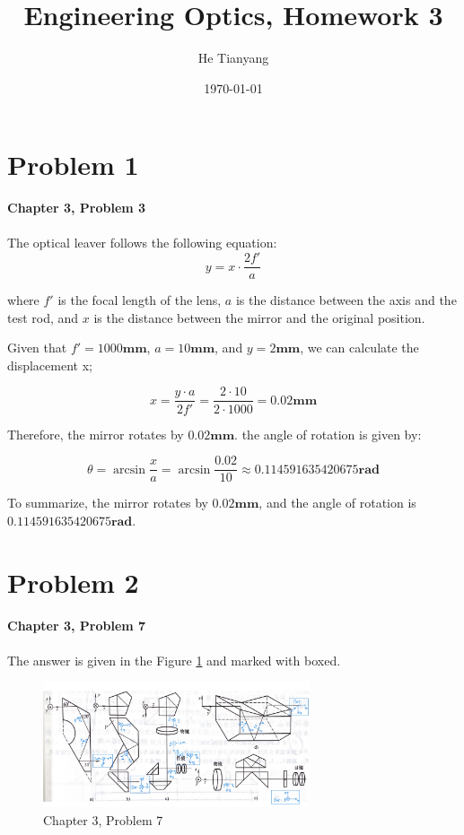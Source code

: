 \documentclass{article}
\title{Engineering Optics, Homework 3}
\author{He Tianyang}
\date{\today}
\begin{document}
\maketitle

\section{Problem 1}
\textbf{Chapter 3, Problem 3}\\\\

The optical leaver follows the following equation:
\begin{equation}
    y = x\cdot\frac{2f'}{a}
\end{equation}

where $f'$ is the focal length of the lens, $a$ is the distance between the axis and the test rod, and $x$ is the distance between the mirror and the original position.

Given that $f' = 1000\textbf{mm}$, $a = 10\textbf{mm}$, and $y = 2\textbf{mm}$, we can calculate the displacement x;

\begin{equation}
    x = \frac{y\cdot a}{2f'} = \frac{2\cdot 10}{2\cdot 1000} = 0.02\textbf{mm}
\end{equation}

Therefore, the mirror rotates by $0.02\textbf{mm}$. the angle of rotation is given by:

\begin{equation}
    \theta = \arcsin{\frac{x}{a}} = \arcsin{\frac{0.02}{10}} \approx 0.114591635420675 \textbf{rad}
\end{equation}

To summarize, the mirror rotates by $\mathbf{0.02}\textbf{mm}$, and the angle of rotation is $\mathbf{0.114591635420675}\textbf{rad}    $.

\section{Problem 2}
\textbf{Chapter 3, Problem 7}\\\\

The answer is given in the Figure \ref{fig:3-7} and marked with boxed.

\begin{figure}[H]
    \centering
    \includegraphics[width=0.7\textwidth]{./image/hw3/hw3_1.jpeg}
    \caption{Chapter 3, Problem 7}
    \label{fig:3-7}
\end{figure}
\end{document}
